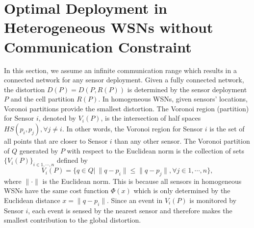 \documentclass[journal,draftcls,onecolumn,12pt,twoside, narroweqnarray]{IEEEtran}
\begin{document}
\section{Optimal Deployment in Heterogeneous WSNs without Communication Constraint}
In this section, we assume an infinite communication range which results in a connected network for any sensor deployment. Given a fully connected network, the distortion $D(P)=D(P,R(P))$ is determined by the sensor deployment $P$ and the cell partition $R(P)$. In homogeneous WSNs, given sensors' locations, Voronoi partitions provide the smallest distortion. The Voronoi region (partition) for Sensor $i$, denoted by $V_i(P)$, is the intersection of half spaces $HS(p_i,p_j),\forall j\ne i$. In other words, the Voronoi region for Sensor $i$ is the set of all points that are closer to Sensor $i$ than any other sensor. The Voronoi partition of $Q$ generated by $P$ with respect to the Euclidean norm is the collection of sets $\{V_i(P)\}_{i\in{1,\cdots,n}}$ defined by
\begin{equation}
V_i(P)=\{q \in Q |\ \|q-p_i\| \le \|q-p_j\|, \forall j \in 1,\cdots,n\},
\end{equation}
where $\|\cdot\|$ is the Euclidean norm. This is because all sensors in homogeneous WSNs have the same cost function $\Phi(x)$ which is only determined by the Euclidean distance $x=\|q-p_i\|$. Since an event in $V_i(P)$ is monitored by Sensor $i$, each event is sensed by the nearest sensor and therefore makes the smallest contribution to the global distortion.
\end{document}
